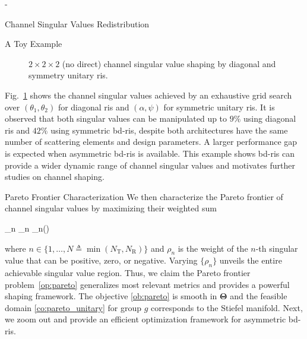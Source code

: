 \begin{section}{-}
\begin{subsection}{Channel Singular Values Redistribution}
\begin{subsubsection}{A Toy Example}
\begin{figure}
				\caption{$2 \times 2 \times 2$ (no direct) channel singular value shaping by diagonal and symmetry unitary \gls{ris}.}
				\label{fg:singular_trend}
			\end{figure}
			Fig.~\ref{fg:singular_trend} shows the channel singular values achieved by an exhaustive grid search over $(\theta_1, \theta_2)$ for diagonal \gls{ris} and $(\alpha, \psi)$ for symmetric unitary \gls{ris}.
			It is observed that both singular values can be manipulated up to $9\%$ using diagonal \gls{ris} and $42\%$ using symmetric \gls{bd}-\gls{ris}, despite both architectures have the same number of scattering elements and design parameters.
			A larger performance gap is expected when asymmetric \gls{bd}-\gls{ris} is available.
			This example shows \gls{bd}-\gls{ris} can provide a wider dynamic range of channel singular values and motivates further studies on channel shaping.
		\end{subsubsection}

		\begin{subsubsection}{Pareto Frontier Characterization}\label{sc:pareto_frontier}
			We then characterize the Pareto frontier of channel singular values by maximizing their weighted sum
			\begin{maxi!}
				{\scriptstyle{\mathbf{\Theta}}}{\sum_n \rho_n \sigma_n()}{\label{op:pareto}}{\label{ob:pareto}}
			\end{maxi!}
			where $n \in \{1,\ldots,N \triangleq \min(N_\mathrm{T}, N_\mathrm{R})\}$ and $\rho_n$ is the weight of the $n$-th singular value that can be positive, zero, or negative.
			Varying $\{\rho_n\}$ unveils the entire achievable singular value region.
			Thus, we claim the Pareto frontier problem~\eqref{op:pareto} generalizes most relevant metrics and provides a powerful shaping framework.
			The objective \eqref{ob:pareto} is smooth in $\mathbf{\Theta}$ and the feasible domain \eqref{co:pareto_unitary} for group $g$ corresponds to the Stiefel manifold.
			Next, we zoom out and provide an efficient optimization framework for asymmetric \gls{bd}-\gls{ris}.


\end{subsubsection}
\end{subsection}
\end{section}
